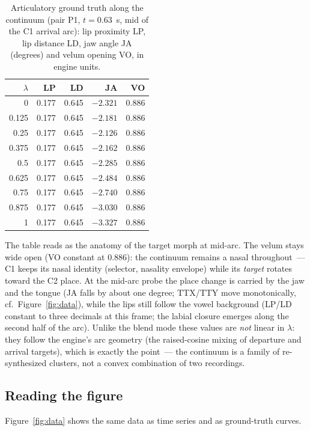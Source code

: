 \documentclass[11pt,a4paper]{article}
\newcommand{\lam}{\lambda}
\begin{document}
\begin{table}[t]
\centering\small
\caption{Articulatory ground truth along the continuum (pair P1,
$t = 0.63$~s, mid of the C1 arrival arc): lip proximity LP, lip
distance LD, jaw angle JA (degrees) and velum opening VO, in engine
units.}\label{tab:articulators}
\begin{tabular}{@{}rrrrr@{}}
\toprule
$\lam$ & LP & LD & JA & VO \\
\midrule
0      & 0.177 & 0.645 & $-2.321$ & 0.886 \\
0.125  & 0.177 & 0.645 & $-2.181$ & 0.886 \\
0.25   & 0.177 & 0.645 & $-2.126$ & 0.886 \\
0.375  & 0.177 & 0.645 & $-2.162$ & 0.886 \\
0.5    & 0.177 & 0.645 & $-2.285$ & 0.886 \\
0.625  & 0.177 & 0.645 & $-2.484$ & 0.886 \\
0.75   & 0.177 & 0.645 & $-2.740$ & 0.886 \\
0.875  & 0.177 & 0.645 & $-3.030$ & 0.886 \\
1      & 0.177 & 0.645 & $-3.327$ & 0.886 \\
\bottomrule
\end{tabular}
\end{table}

The table reads as the anatomy of the target morph at mid-arc.
The velum stays wide open (VO constant at 0.886): the continuum
remains a nasal throughout~--- C1 keeps its nasal identity
(selector, nasality envelope) while its \emph{target} rotates
toward the C2 place.  At the mid-arc probe the place change is
carried by the jaw and the tongue (JA falls by about one degree;
TTX/TTY move monotonically, cf.\ Figure~\ref{fig:data}), while the
lips still follow the vowel background (LP/LD constant to three
decimals at this frame; the labial closure emerges along the
second half of the arc).  Unlike the blend mode these values are
\emph{not} linear in $\lam$: they follow the engine's arc geometry
(the raised-cosine mixing of departure and arrival targets), which
is exactly the point~--- the continuum is a family of
re-synthesized clusters, not a convex combination of two
recordings.

\subsection{Reading the figure}

Figure~\ref{fig:data} shows the same data as time series and as
ground-truth curves.
\end{document}
